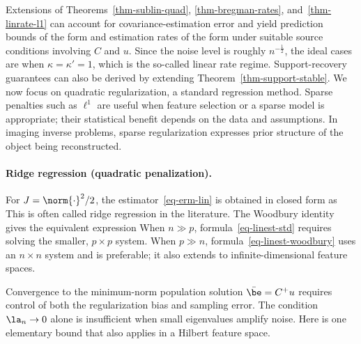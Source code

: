 Extensions of Theorems~\ref{thm-sublin-quad}, \ref{thm-bregman-rates}, and~\ref{thm-linrate-l1} can account for covariance-estimation error and yield prediction bounds of the form
and estimation rates of the form 
under suitable source conditions involving $C$ and $u$.
%
Since the noise level is roughly $n^{-\frac{1}{2}}$, the ideal cases are when $\kappa=\kappa'=1$, which is the so-called linear rate regime.  
%
Support-recovery guarantees can also be derived by extending Theorem~\ref{thm-support-stable}. We now focus on quadratic regularization, a standard regression method. Sparse penalties such as $\ell^1$ are useful when feature selection or a sparse model is appropriate; their statistical benefit depends on the data and assumptions.
%
In imaging inverse problems, sparse regularization expresses prior structure of the object being reconstructed.

\paragraph{Ridge regression (quadratic penalization).}

For $J=\norm{\cdot}^2/2$, the estimator~\eqref{eq-erm-lin} is obtained in closed form as
This is often called ridge regression in the literature.
%
The Woodbury identity gives the equivalent expression
When $n\gg p$, formula~\eqref{eq-linest-std} requires solving the smaller, $p\times p$ system. When $p\gg n$, formula~\eqref{eq-linest-woodbury} uses an $n\times n$ system and is preferable; it also extends to infinite-dimensional feature spaces.

Convergence to the minimum-norm population solution $\bar\be=C^+u$ requires control of both the regularization bias and sampling error. The condition $\la_n\to0$ alone is insufficient when small eigenvalues amplify noise. Here is one elementary bound that also applies in a Hilbert feature space.

